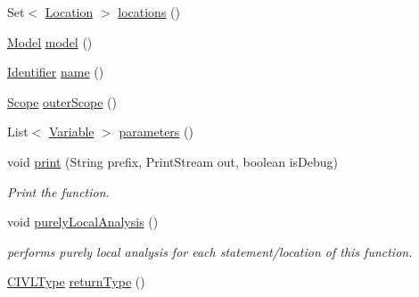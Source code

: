 \begin{DoxyCompactItemize}
\item 
Set$<$ \hyperlink{interfaceedu_1_1udel_1_1cis_1_1vsl_1_1civl_1_1model_1_1IF_1_1location_1_1Location}{Location} $>$ \hyperlink{classedu_1_1udel_1_1cis_1_1vsl_1_1civl_1_1model_1_1common_1_1CommonFunction_a652ef3fe51ae2c1e49dd9b30470cb380}{locations} ()
\item 
\hyperlink{interfaceedu_1_1udel_1_1cis_1_1vsl_1_1civl_1_1model_1_1IF_1_1Model}{Model} \hyperlink{classedu_1_1udel_1_1cis_1_1vsl_1_1civl_1_1model_1_1common_1_1CommonFunction_a2df01b9d975ec4a9b9464cf60a6e915b}{model} ()
\item 
\hyperlink{interfaceedu_1_1udel_1_1cis_1_1vsl_1_1civl_1_1model_1_1IF_1_1Identifier}{Identifier} \hyperlink{classedu_1_1udel_1_1cis_1_1vsl_1_1civl_1_1model_1_1common_1_1CommonFunction_a328ab85c9bdaca980612b78a28e9ea79}{name} ()
\item 
\hyperlink{interfaceedu_1_1udel_1_1cis_1_1vsl_1_1civl_1_1model_1_1IF_1_1Scope}{Scope} \hyperlink{classedu_1_1udel_1_1cis_1_1vsl_1_1civl_1_1model_1_1common_1_1CommonFunction_aa8e0015aeb303afab19acc3fd5fd81e4}{outer\+Scope} ()
\item 
List$<$ \hyperlink{interfaceedu_1_1udel_1_1cis_1_1vsl_1_1civl_1_1model_1_1IF_1_1variable_1_1Variable}{Variable} $>$ \hyperlink{classedu_1_1udel_1_1cis_1_1vsl_1_1civl_1_1model_1_1common_1_1CommonFunction_a5461836cc42794a187d0a1407f6136f1}{parameters} ()
\item 
void \hyperlink{classedu_1_1udel_1_1cis_1_1vsl_1_1civl_1_1model_1_1common_1_1CommonFunction_a11c1f76d0d1ae8a39f66ebc935235af0}{print} (String prefix, Print\+Stream out, boolean is\+Debug)
\begin{DoxyCompactList}\small\item\em Print the function. \end{DoxyCompactList}\item 
void \hyperlink{classedu_1_1udel_1_1cis_1_1vsl_1_1civl_1_1model_1_1common_1_1CommonFunction_aa274418eb0f1366228092ac8fb95c1dd}{purely\+Local\+Analysis} ()
\begin{DoxyCompactList}\small\item\em performs purely local analysis for each statement/location of this function. \end{DoxyCompactList}\item 
\hyperlink{interfaceedu_1_1udel_1_1cis_1_1vsl_1_1civl_1_1model_1_1IF_1_1type_1_1CIVLType}{C\+I\+V\+L\+Type} \hyperlink{classedu_1_1udel_1_1cis_1_1vsl_1_1civl_1_1model_1_1common_1_1CommonFunction_a10255f23596c5974e8474769f03a4848}{return\+Type} ()
\item 

\end{DoxyCompactItemize}
